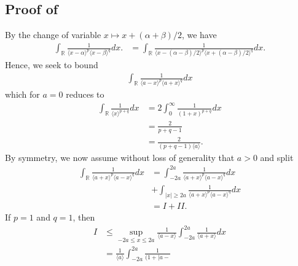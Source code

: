 \documentclass[12pt,reqno]{amsart}
\numberwithin{equation}{section}  %
\renewcommand{\cref}{\Cref}
\newcommand{\rr}{\mathbb{R}}
\begin{document}
\begin{appendices}
\subsection{Proof of \cref{lem:calc}}
%
By the change of variable $x \mapsto x + (\alpha + \beta)/2$, we have
%
%
\begin{equation*}
	\begin{split}
    \int_{\rr} \frac{1}{\langle x - \alpha \rangle^{p} \langle  x -
    \beta
    \rangle^{q}}d x.
    & = \int_{\rr} \frac{1}{\langle x - (\alpha - \beta)/2  \rangle^{p}
    \langle  x + (\alpha - \beta)/2 \rangle^{q}} d x.
	\end{split}
\end{equation*}
%
%
Hence, we seek to bound
%
%
%
\begin{equation*}
\begin{split}
  \int_{\rr} \frac{1}{\langle a - x \rangle ^{p} \langle a + x \rangle
  ^{q}} d x
\end{split}
\end{equation*}
%
which for $a =0$ reduces to 
%
%
\begin{equation*}
\begin{split}
  \int_{\rr} \frac{1}{\langle x \rangle ^{p+q}} d x 
  & = 2 \int_{0}^{\infty} \frac{1}{(1 + x)^{p+q}} d x
  \\
  & = \frac{2}{p+q -1}
  \\
  & = \frac{2}{(p+q -1)\langle a \rangle}.
\end{split}
\end{equation*}
%
%
By symmetry, we now assume without loss of generality that $a > 0$ and split 
%
%
\begin{equation*}
\begin{split}
\int_{\rr} \frac{1}{\langle a + x \rangle ^{p} \langle a - x \rangle
  ^{q}} d x
  & = \int_{-2a}^{2a}
  \frac{1}{\langle a + x \rangle ^{p} \langle a - x \rangle
  ^{q}} d x
  \\
  & + \int_{| x | \ge 2a} 
\frac{1}{\langle a + x \rangle ^{p} \langle a - x \rangle
  ^{q}} d x
  \\
  & = I + II.
\end{split}
\end{equation*}
%
%
If $p=1$ and $q=1$, then 
%
%
\begin{equation*}
\begin{split}
  I
  & \le \sup_{-2a \le x \le 2a} \frac{1}{\langle a - x \rangle
} \int_{-2a}^{2a} \frac{1}{\langle a + x \rangle} d x
  \\
  & = \frac{1}{\langle a \rangle} \int_{-2a}^{2a} \frac{1}{(1 + | a -
}
\end{split}
\end{equation*}
\end{appendices}
\end{document}
